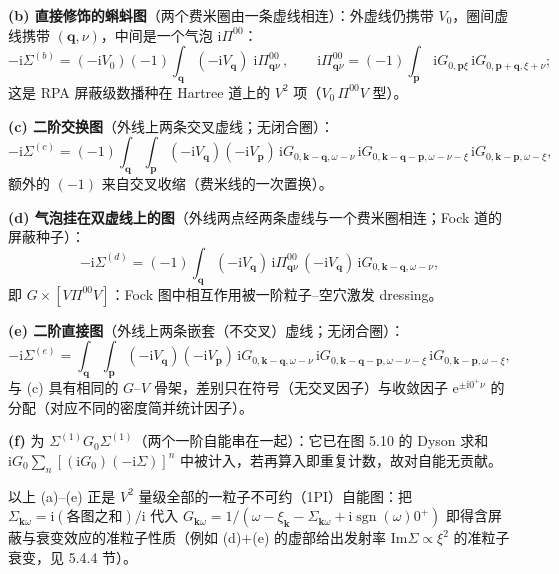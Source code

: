 \textbf{(b) 直接修饰的蝌蚪图}（两个费米圈由一条虚线相连）：外虚线仍携带 $V_0$，圈间虚线携带 $(\pmb q,\nu)$，中间是一个气泡 $\mathrm{i}\Pi^{00}$：
\begin{equation*}
-\mathrm{i}\Sigma^{(b)}
=(-\mathrm{i}V_0)(-1)\int_{\pmb q}(-\mathrm{i}V_{\pmb q})\;\mathrm{i}\Pi^{00}_{\pmb q\nu}\,,
\qquad
\mathrm{i}\Pi^{00}_{\pmb q\nu}=(-1)\int_{\pmb p}\,\mathrm{i}G_{0,\pmb p\xi}\,\mathrm{i}G_{0,\pmb p+\pmb q,\xi+\nu} ;
\end{equation*}
这是 RPA 屏蔽级数播种在 Hartree 道上的 $V^{2}$ 项（$V_0\,\Pi^{00}V$ 型）。

\textbf{(c) 二阶交换图}（外线上两条交叉虚线；无闭合圈）：
\begin{equation*}
-\mathrm{i}\Sigma^{(c)}
=(-1)\int_{\pmb q}\!\int_{\pmb p}(-\mathrm{i}V_{\pmb q})(-\mathrm{i}V_{\pmb p})\,
\mathrm{i}G_{0,\pmb k-\pmb q,\omega-\nu}\,
\mathrm{i}G_{0,\pmb k-\pmb q-\pmb p,\omega-\nu-\xi}\,
\mathrm{i}G_{0,\pmb k-\pmb p,\omega-\xi} ,
\end{equation*}
额外的 $(-1)$ 来自交叉收缩（费米线的一次置换）。

\textbf{(d) 气泡挂在双虚线上的图}（外线两点经两条虚线与一个费米圈相连；Fock 道的屏蔽种子）：
\begin{equation*}
-\mathrm{i}\Sigma^{(d)}
=(-1)\int_{\pmb q}(-\mathrm{i}V_{\pmb q})\,\mathrm{i}\Pi^{00}_{\pmb q\nu}\,(-\mathrm{i}V_{\pmb q})\,
\mathrm{i}G_{0,\pmb k-\pmb q,\omega-\nu} ,
\end{equation*}
即 $G\times[V\Pi^{00}V]$：Fock 图中相互作用被一阶粒子--空穴激发 dressing。

\textbf{(e) 二阶直接图}（外线上两条嵌套（不交叉）虚线；无闭合圈）：
\begin{equation*}
-\mathrm{i}\Sigma^{(e)}
=\int_{\pmb q}\!\int_{\pmb p}(-\mathrm{i}V_{\pmb q})(-\mathrm{i}V_{\pmb p})\,
\mathrm{i}G_{0,\pmb k-\pmb q,\omega-\nu}\,
\mathrm{i}G_{0,\pmb k-\pmb q-\pmb p,\omega-\nu-\xi}\,
\mathrm{i}G_{0,\pmb k-\pmb p,\omega-\xi} ,
\end{equation*}
与 (c) 具有相同的 $G$--$V$ 骨架，差别只在符号（无交叉因子）与收敛因子 $\mathrm{e}^{\pm\mathrm{i}0^{+}\nu}$ 的分配（对应不同的密度简并统计因子）。

\textbf{(f)} 为 $\Sigma^{(1)}G_0\Sigma^{(1)}$（两个一阶自能串在一起）：它已在图 5.10 的 Dyson 求和 $\mathrm{i}G_0\sum_n[(\mathrm{i}G_0)(-\mathrm{i}\Sigma)]^{n}$ 中被计入，若再算入即重复计数，故对自能无贡献。

以上 (a)--(e) 正是 $V^{2}$ 量级全部的一粒子不可约（1PI）自能图：把 $\Sigma_{\pmb{k}\omega}=\mathrm{i}(\text{各图之和})/\mathrm{i}$ 代入 $G_{\pmb{k}\omega}=1/(\omega-\xi_{\pmb{k}}-\Sigma_{\pmb{k}\omega}+\mathrm{i}\operatorname{sgn}(\omega)0^{+})$ 即得含屏蔽与衰变效应的准粒子性质（例如 (d)+(e) 的虚部给出发射率 $\mathrm{Im}\Sigma\propto\xi^{2}$ 的准粒子衰变，见 5.4.4 节）。

